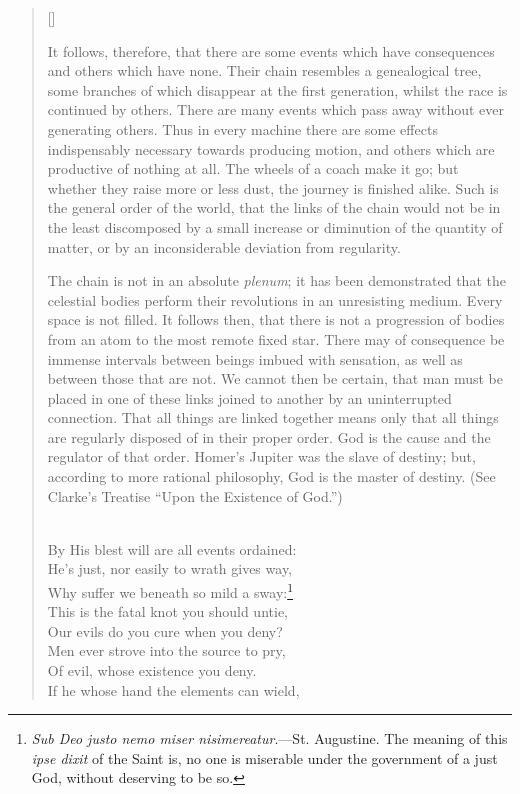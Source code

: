 \begin{verse}[\versewidth]
{It follows, therefore, that there are some events which have
consequences and others which have none. Their chain resembles a
genealogical tree, some branches of which disappear at the first
generation, whilst the race is continued by others. There are many
events which pass away without ever generating others. Thus in every
machine there are some effects indispensably necessary towards
producing motion, and others which are productive of nothing at all.
The wheels of a coach make it go; but whether they raise more or less
dust, the journey is finished alike. Such is the general order of the
world, that the links of the chain would not be in the least
discomposed by a small increase or diminution of the quantity of
matter, or by an inconsiderable deviation from regularity.

The chain is not in an absolute \textit{plenum}; it has been
demonstrated that the celestial bodies perform their revolutions in an
unresisting medium. Every space is not filled. It follows then, that
there is not a progression of bodies from an atom to the most remote
fixed star. There may of consequence be immense intervals between
beings imbued with sensation, as well as between those that are not.
We cannot then be certain, that man must be placed in one of these
links joined to another by an uninterrupted connection. That all
things are linked together means only that all things are regularly
disposed of in their proper order. God is the cause and the regulator
of that order. Homer's Jupiter was the slave of destiny; but,
according to more rational philosophy, God is the master of destiny.
(See Clarke's Treatise ``Upon the Existence of God.'')}\\
By His blest will are all events ordained:\\
He's just, nor easily to wrath gives way,\\
Why suffer we beneath so mild a sway:\footnote{\textit{Sub
Deo justo nemo miser nisimereatur}.---St. Augustine. The meaning of
this \textit{ipse dixit} of the Saint is, no one is miserable under
the government of a just God, without deserving to be so.}\\
This is the fatal knot you should untie,\\
Our evils do you cure when you deny?\\
Men ever strove into the source to pry,\\
Of evil, whose existence you deny.\\
If he whose hand the elements can wield,\\

\end{verse}
